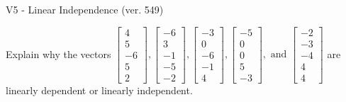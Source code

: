 \begin{exercise}
  \begin{exerciseTitle}V5 - Linear Independence (ver. 549)\end{exerciseTitle}
  \begin{exerciseStatement}
    Explain why the vectors \(\left[\begin{array}{r}
4 \\
5 \\
-6 \\
5 \\
2
\end{array}\right] , \left[\begin{array}{r}
-6 \\
3 \\
-1 \\
-5 \\
-2
\end{array}\right] , \left[\begin{array}{r}
-3 \\
0 \\
-6 \\
-1 \\
4
\end{array}\right] , \left[\begin{array}{r}
-5 \\
0 \\
0 \\
5 \\
-3
\end{array}\right] , \text{ and } \left[\begin{array}{r}
-2 \\
-3 \\
-4 \\
4 \\
4
\end{array}\right]\) are linearly dependent or linearly independent.	



\end{exerciseStatement}
\end{exercise}

